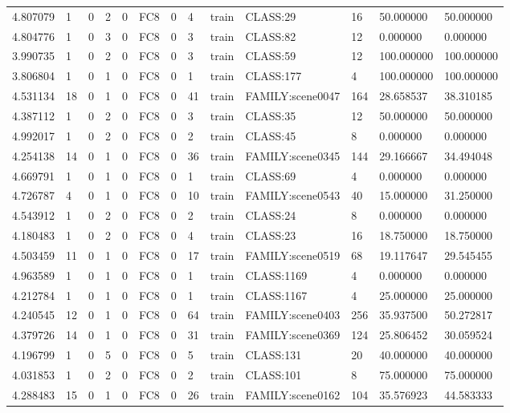 \begin{tabular}{lllllllllllll}
4.807079 & 1 & 0 & 2 & 0 & FC8 & 0 & 4 & train & CLASS:29 & 16 & 50.000000 & 50.000000 \\
4.804776 & 1 & 0 & 3 & 0 & FC8 & 0 & 3 & train & CLASS:82 & 12 & 0.000000 & 0.000000 \\
3.990735 & 1 & 0 & 2 & 0 & FC8 & 0 & 3 & train & CLASS:59 & 12 & 100.000000 & 100.000000 \\
3.806804 & 1 & 0 & 1 & 0 & FC8 & 0 & 1 & train & CLASS:177 & 4 & 100.000000 & 100.000000 \\
4.531134 & 18 & 0 & 1 & 0 & FC8 & 0 & 41 & train & FAMILY:scene0047 & 164 & 28.658537 & 38.310185 \\
4.387112 & 1 & 0 & 2 & 0 & FC8 & 0 & 3 & train & CLASS:35 & 12 & 50.000000 & 50.000000 \\
4.992017 & 1 & 0 & 2 & 0 & FC8 & 0 & 2 & train & CLASS:45 & 8 & 0.000000 & 0.000000 \\
4.254138 & 14 & 0 & 1 & 0 & FC8 & 0 & 36 & train & FAMILY:scene0345 & 144 & 29.166667 & 34.494048 \\
4.669791 & 1 & 0 & 1 & 0 & FC8 & 0 & 1 & train & CLASS:69 & 4 & 0.000000 & 0.000000 \\
4.726787 & 4 & 0 & 1 & 0 & FC8 & 0 & 10 & train & FAMILY:scene0543 & 40 & 15.000000 & 31.250000 \\
4.543912 & 1 & 0 & 2 & 0 & FC8 & 0 & 2 & train & CLASS:24 & 8 & 0.000000 & 0.000000 \\
4.180483 & 1 & 0 & 2 & 0 & FC8 & 0 & 4 & train & CLASS:23 & 16 & 18.750000 & 18.750000 \\
4.503459 & 11 & 0 & 1 & 0 & FC8 & 0 & 17 & train & FAMILY:scene0519 & 68 & 19.117647 & 29.545455 \\
4.963589 & 1 & 0 & 1 & 0 & FC8 & 0 & 1 & train & CLASS:1169 & 4 & 0.000000 & 0.000000 \\
4.212784 & 1 & 0 & 1 & 0 & FC8 & 0 & 1 & train & CLASS:1167 & 4 & 25.000000 & 25.000000 \\
4.240545 & 12 & 0 & 1 & 0 & FC8 & 0 & 64 & train & FAMILY:scene0403 & 256 & 35.937500 & 50.272817 \\
4.379726 & 14 & 0 & 1 & 0 & FC8 & 0 & 31 & train & FAMILY:scene0369 & 124 & 25.806452 & 30.059524 \\
4.196799 & 1 & 0 & 5 & 0 & FC8 & 0 & 5 & train & CLASS:131 & 20 & 40.000000 & 40.000000 \\
4.031853 & 1 & 0 & 2 & 0 & FC8 & 0 & 2 & train & CLASS:101 & 8 & 75.000000 & 75.000000 \\
4.288483 & 15 & 0 & 1 & 0 & FC8 & 0 & 26 & train & FAMILY:scene0162 & 104 & 35.576923 & 44.583333 \\

\end{tabular}
